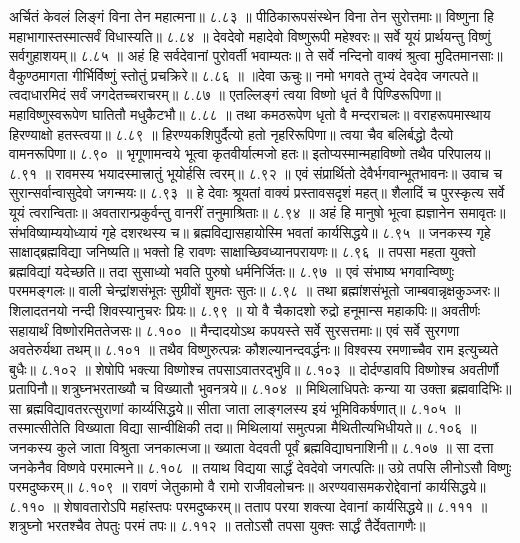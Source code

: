 अर्चितं केवलं लिङ्गं विना तेन महात्मना॥ ८.८३ ॥
पीठिकारूपसंस्थेन विना तेन सुरोत्तमाः॥
विष्णुना हि महाभागास्तस्मात्सर्वं विधास्यति॥ ८.८४ ॥
देवदेवो महादेवो विष्णुरूपी महेश्वरः॥
सर्वे यूयं प्रार्थयन्तु विष्णुं सर्वगुहाशयम्॥ ८.८५ ॥
अहं हि सर्वदेवानां पुरोवर्ती भवाम्यतः॥
ते सर्वे नन्दिनो वाक्यं श्रुत्वा मुदितमानसाः॥
वैकुण्ठमागता गीर्भिर्विष्णुं स्तोतुं प्रचक्रिरे॥ ८.८६ ॥
॥देवा ऊचुः॥
नमो भगवते तुभ्यं देवदेव जगत्पते॥
त्वदाधारमिदं सर्वं जगदेतच्चराचरम्॥ ८.८७ ॥
एतल्लिङ्गं त्वया विष्णो धृतं वै पिण्डिरूपिणा॥
महाविष्णुस्वरूपेण घातितौ मधुकैटभौ॥ ८.८८ ॥
तथा कमठरूपेण धृतो वै मन्दराचलः॥
वराहरूपमास्थाय हिरण्याक्षो हतस्त्वया॥ ८.८९ ॥
हिरण्यकशिपुर्दैत्यो हतो नृहरिरूपिणा॥
त्वया चैव बलिर्बद्धो दैत्यो वामनरूपिणा॥ ८.९० ॥
भृगूणामन्वये भूत्वा कृतवीर्यात्मजो हतः॥
इतोप्यस्मान्महाविष्णो तथैव परिपालय॥ ८.९१ ॥
रावमस्य भयादस्मात्त्रातुं भूयोर्हसि त्वरम्॥ ८.९२ ॥
एवं संप्रार्थितो देवैर्भगवान्भूतभावनः॥
उवाच च सुरान्सर्वान्वासुदेवो जगन्मयः॥ ८.९३ ॥
हे देवाः श्रूयतां वाक्यं प्रस्तावसदृशं महत्॥
शैलादिं च पुरस्कृत्य सर्वे यूयं त्वरान्विताः॥
अवतारान्प्रकुर्वन्तु वानरीं तनुमाश्रिताः॥ ८.९४ ॥
अहं हि मानुषो भूत्वा ह्यज्ञानेन समावृतः॥
संभविष्याम्ययोध्यायं गृहे दशरथस्य च॥
ब्रह्मविद्यासहायोस्मि भवतां कार्यसिद्धये॥ ८.९५ ॥
जनकस्य गृहे साक्षाद्ब्रह्मविद्या जनिष्यति॥
भक्तो हि रावणः साक्षाच्छिवध्यानपरायणः॥ ८.९६ ॥
तपसा महता युक्तो ब्रह्मविद्यां यदेच्छति॥
तदा सुसाध्यो भवति पुरुषो धर्मनिर्जितः॥ ८.९७ ॥
एवं संभाष्य भगवान्विष्णुः परममङ्गलः॥
वाली चेन्द्रांशसंभूतः सुग्रीवों शुमतः सुतः॥ ८.९८ ॥
तथा ब्रह्मांशसंभूतो जाम्बवान्नृक्षकुञ्जरः॥
शिलादतनयो नन्दी शिवस्यानुचरः प्रियः॥ ८.९९ ॥
यो वै चैकादशो रुद्रो हनूमान्स महाकपिः॥
अवतीर्णः सहायार्थं विष्णोरमिततेजसः॥ ८.१०० ॥
मैन्दादयोऽथ कपयस्ते सर्वे सुरसत्तमाः॥
एवं सर्वे सुरगणा अवतेरुर्यथा तथम्॥ ८.१०१ ॥
तथैव विष्णुरुत्पन्नः कौशल्यानन्दवर्द्धनः॥
विश्वस्य रमणाच्चैव राम इत्युच्यते बुधैः॥ ८.१०२ ॥
शेषोपि भक्त्या विष्णोश्च तपसाऽवातरद्भुवि॥ ८.१०३ ॥
दोर्दण्डावपि विष्णोश्च अवतीर्णौ प्रतापिनौ॥
शत्रुघ्नभरताख्यौ च विख्यातौ भुवनत्रये॥ ८.१०४ ॥
मिथिलाधिपतेः कन्या या उक्ता ब्रह्मवादिभिः॥
सा ब्रह्मविद्यावतरत्सुराणां कार्य्यसिद्धये॥
सीता जाता लाङ्गलस्य इयं भूमिविकर्षणात्॥ ८.१०५ ॥
तस्मात्सीतेति विख्याता विद्या सान्वीक्षिकी तदा॥
मिथिलायां समुत्पन्ना मैथितीत्यभिधीयते॥ ८.१०६ ॥
जनकस्य कुले जाता विश्रुता जनकात्मजा॥
ख्याता वेदवती पूर्वं ब्रह्मविद्याघनाशिनी॥ ८.१०७ ॥
सा दत्ता जनकेनैव विष्णवे परमात्मने॥ ८.१०८ ॥
तयाथ विद्यया सार्द्धं देवदेवो जगत्पतिः॥
उग्रे तपसि लीनोऽसौ विष्णुः परमदुष्करम्॥ ८.१०९ ॥
रावणं जेतुकामो वै रामो राजीवलोचनः॥
अरण्यवासमकरोद्देवानां कार्यसिद्धये॥ ८.११० ॥
शेषावतारोऽपि महांस्तपः परमदुष्करम्॥
तताप परया शक्त्या देवानां कार्यसिद्धये॥ ८.१११ ॥
शत्रुघ्नो भरतश्चैव तेपतुः परमं तपः॥ ८.११२ ॥
ततोऽसौ तपसा युक्तः सार्द्धं तैर्देवतागणैः॥
